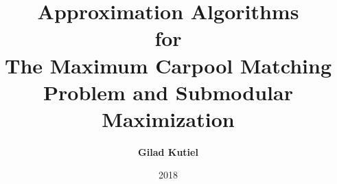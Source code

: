 \title{
Approximation Algorithms 
\\
for
\\
The Maximum Carpool Matching Problem and Submodular Maximization
}
\author[shortname]{
    \textbf{Gilad Kutiel}
}
\date{2018}

